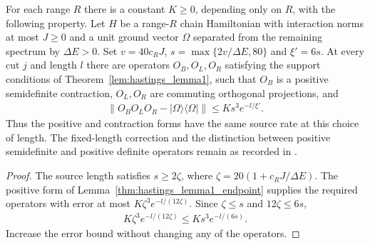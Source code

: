 \begin{theorem}
    \label{thm:hastings_source_factorization}
    \leanok
    For each range $R$ there is a constant $K\ge0$, depending only on $R$,
    with the following property. Let $H$ be a range-$R$ chain Hamiltonian
    with interaction norms at most $J\ge0$ and a unit ground vector
    $\Omega$ separated from the remaining spectrum by $\Delta E>0$.
    Set $v=40c_RJ$, $s=\max\{2v/\Delta E,80\}$ and $\xi'=6s$. At every
    cut $j$ and length $l$ there are operators $O_B,O_L,O_R$ satisfying
    the support conditions of Theorem~\ref{lem:hastings_lemma1}, such that
    $O_B$ is a positive semidefinite contraction, $O_L,O_R$ are commuting
    orthogonal projections, and
    \begin{align}
        \|O_BO_LO_R-|\Omega\rangle\langle\Omega|\|
        \le Ks^3e^{-l/\xi'}.
        \label{eq:hastings_positive_source_factorization}
    \end{align}
    Thus the positive and contraction forms have the same source rate
    at this choice of length. The fixed-length correction and the
    distinction between positive semidefinite and positive definite
    operators remain as recorded in
    \cite{gap:hastings07_lemma1_positivity_rate}.
\end{theorem}
\begin{proof}\leanok
    The source length satisfies $s\ge2\zeta$, where
    $\zeta=20(1+c_RJ/\Delta E)$. The positive form of
    Lemma~\ref{thm:hastings_lemma1_endpoint} supplies the required
    operators with error at most $K\zeta^3e^{-l/(12\zeta)}$. Since
    $\zeta\le s$ and $12\zeta\le6s$,
    \begin{align}
        K\zeta^3e^{-l/(12\zeta)}\le Ks^3e^{-l/(6s)}.
        \label{eq:hastings_positive_source_comparison}
    \end{align}
    Increase the error bound without changing any of the operators.
\end{proof}
